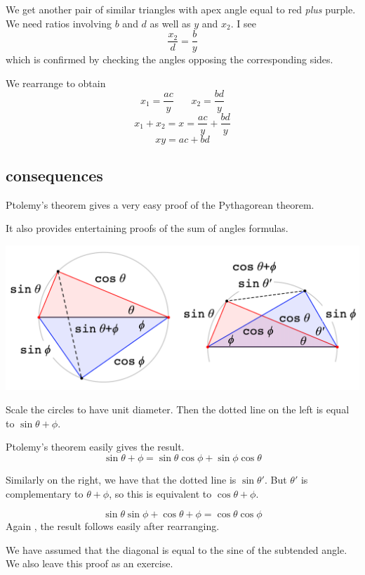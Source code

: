 \documentclass[11pt, oneside]{article}
\begin{document}
We get another pair of similar triangles with apex angle equal to red \emph{plus} purple.  We need ratios involving $b$ and $d$ as well as $y$ and $x_2$.  I see
\[ \frac{x_2}{d} = \frac{b}{y} \]
which is confirmed by checking the angles opposing the corresponding sides.

We rearrange to obtain
\[ x_1 = \frac{ac}{y} \ \ \ \ \ \ \ \ x_2 = \frac{bd}{y} \]
\[ x_1 + x_2 = x = \frac{ac}{y} + \frac{bd}{y} \]
\[ xy = ac + bd \]

\subsection*{consequences}

Ptolemy's theorem gives a very easy proof of the Pythagorean theorem.

It also provides entertaining proofs of the sum of angles formulas.

\begin{center} \includegraphics [scale=0.35] {sum_of_angles.png} \end{center}

Scale the circles to have unit diameter.  Then the dotted line on the left is equal to $\sin \theta + \phi$.

Ptolemy's theorem easily gives the result.
\[ \sin \theta + \phi = \sin \theta \cos \phi + \sin \phi \cos \theta \]

Similarly on the right, we have that the dotted line is $\sin \theta'$.  But $\theta'$ is complementary to $\theta + \phi$, so this is equivalent to $\cos \theta + \phi$.

\[ \sin \theta \sin \phi + \cos \theta + \phi = \cos \theta \cos \phi \]
Again , the result follows easily after rearranging.

We have assumed that the diagonal is equal to the sine of the subtended angle.  We also leave this proof as an exercise.
\end{document}
